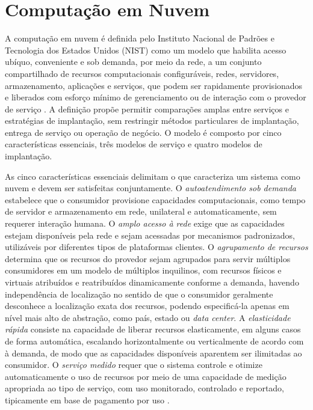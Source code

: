 
\section{Computação em Nuvem}

A computação em nuvem é definida pelo Instituto Nacional de Padrões e Tecnologia dos Estados Unidos (NIST) como um modelo que habilita acesso ubíquo, conveniente e sob demanda, por meio da rede, a um conjunto compartilhado de recursos computacionais configuráveis, redes, servidores, armazenamento, aplicações e serviços, que podem ser rapidamente provisionados e liberados com esforço mínimo de gerenciamento ou de interação com o provedor de serviço \cite{mell2011nist}. A definição propõe permitir comparações amplas entre serviços e estratégias de implantação, sem restringir métodos particulares de implantação, entrega de serviço ou operação de negócio. O modelo é composto por cinco características essenciais, três modelos de serviço e quatro modelos de implantação.

As cinco características essenciais delimitam o que caracteriza um sistema como nuvem e devem ser satisfeitas conjuntamente. O \emph{autoatendimento sob demanda} estabelece que o consumidor provisione capacidades computacionais, como tempo de servidor e armazenamento em rede, unilateral e automaticamente, sem requerer interação humana. O \emph{amplo acesso à rede} exige que as capacidades estejam disponíveis pela rede e sejam acessadas por mecanismos padronizados, utilizáveis por diferentes tipos de plataformas clientes. O \emph{agrupamento de recursos} determina que os recursos do provedor sejam agrupados para servir múltiplos consumidores em um modelo de múltiplos inquilinos, com recursos físicos e virtuais atribuídos e reatribuídos dinamicamente conforme a demanda, havendo independência de localização no sentido de que o consumidor geralmente desconhece a localização exata dos recursos, podendo especificá-la apenas em nível mais alto de abstração, como país, estado ou \emph{data center}. A \emph{elasticidade rápida} consiste na capacidade de liberar recursos elasticamente, em alguns casos de forma automática, escalando horizontalmente ou verticalmente de acordo com à demanda, de modo que as capacidades disponíveis aparentem ser ilimitadas ao consumidor. O \emph{serviço medido} requer que o sistema controle e otimize automaticamente o uso de recursos por meio de uma capacidade de medição apropriada ao tipo de serviço, com uso monitorado, controlado e reportado, tipicamente em base de pagamento por uso \cite{mell2011nist}.

